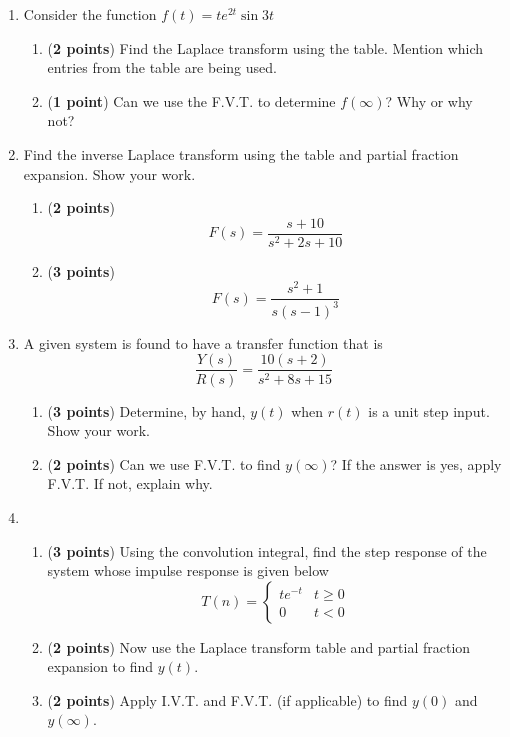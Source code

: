 \documentclass[]{article}
\begin{document}
\begin{enumerate}

    \item Consider the function $f(t)=te^{2t}\sin{3t}$
    \begin{enumerate}
        \item (\textbf{2 points}) Find the Laplace transform using the table. Mention which entries from the table are being used.
        \item (\textbf{1 point}) Can we use the F.V.T. to determine $f(\infty)$? Why or why not?
    \end{enumerate}
    \vspace{0.4 cm}


    \item Find the inverse Laplace transform using the table and partial fraction expansion. Show your work.
    \begin{enumerate}
        \item (\textbf{2 points}) $$F(s)=\frac{s+10}{s^2+2s+10}$$
        \item (\textbf{3 points}) $$F(s)=\frac{s^2+1}{s(s-1)^3}$$
    \end{enumerate}
    \vspace{0.4 cm}

    \item A given system is found to have a transfer function that is
    $$\frac{Y(s)}{R(s)}=\frac{10(s+2)}{s^2+8s+15}$$
    \begin{enumerate}
        \item (\textbf{3 points}) Determine, by hand, $y(t)$ when $r(t)$ is a unit step input. Show your work.
        \item (\textbf{2 points}) Can we use F.V.T. to find $y(\infty)$? If the answer is yes, apply F.V.T. If not, explain why.
    \end{enumerate}
    \vspace{0.4 cm}

    \item    
    \begin{enumerate}
        \item (\textbf{3 points}) Using the convolution integral, find the step response of the system whose impulse response is given below
        \[
            T(n)=
            \begin{cases}
                te^{-t} & t \geq 0\\
                0       & t < 0
            \end{cases}
        \]
        \item (\textbf{2 points}) Now use the Laplace transform table and partial fraction expansion to find $y(t)$.
        \item (\textbf{2 points}) Apply I.V.T. and F.V.T. (if applicable) to find $y(0)$ and $y(\infty)$.
    \end{enumerate}
    \vspace{0.4 cm}


\end{enumerate}
\end{document}
